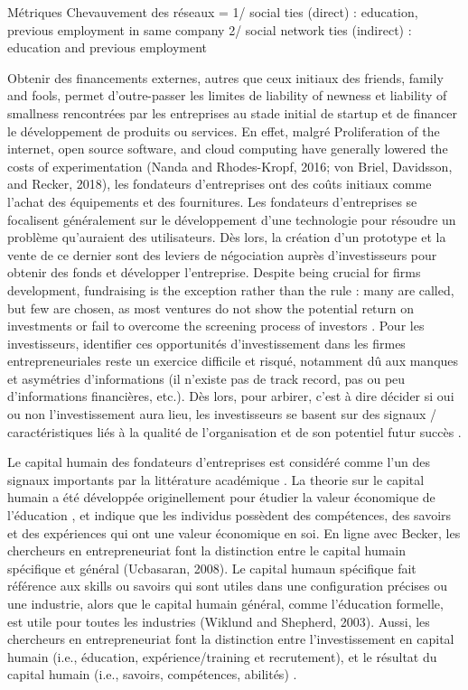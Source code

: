 \documentclass[11pt]{article}
\begin{document}
Métriques
Chevauvement des réseaux =
1/ social ties (direct) : education, previous employment in same company
2/ social network ties (indirect) : education and previous employment

Obtenir des financements externes, autres que ceux initiaux des friends, family and fools, permet d'outre-passer les limites de liability of newness et liability of smallness rencontrées par les entreprises au stade initial de startup et de financer le développement de produits ou services. En effet, malgré Proliferation of the internet, open source software, and cloud computing have generally lowered the costs of experimentation (Nanda and Rhodes-Kropf, 2016; von Briel, Davidsson, and Recker, 2018), les fondateurs d'entreprises ont des coûts initiaux comme l'achat des équipements et des fournitures. Les fondateurs d'entreprises se focalisent généralement sur le développement d'une technologie pour résoudre un problème qu'auraient des utilisateurs. Dès lors, la création d'un prototype et la vente de ce dernier sont des leviers de négociation auprès d'investisseurs pour obtenir des fonds et développer l'entreprise. Despite being crucial for firms development, fundraising is the exception rather than the rule : many are called, but few are chosen, as most ventures do not show the potential return on investments or fail to overcome the screening process of investors \citep{huang2017growing}. Pour les investisseurs, identifier ces opportunités d'investissement dans les firmes entrepreneuriales reste un exercice difficile et risqué, notamment dû aux manques et asymétries d'informations (il n'existe pas de track record, pas ou peu d'informations financières, etc.). Dès lors, pour arbirer, c'est à dire décider si oui ou non l'investissement aura lieu, les investisseurs se basent sur des signaux / caractéristiques liés à la qualité de l'organisation et de son potentiel futur succès \citep{plummer2016better}.

Le capital humain des fondateurs d'entreprises est considéré comme l'un des signaux importants par la littérature académique \citet{pinelli2020too, ko2018signaling}. La theorie sur le capital humain a été développée originellement pour étudier la valeur économique de l'éducation \citep{becker1964human}, et indique que les individus possèdent des compétences, des savoirs et des expériences qui ont une valeur économique en soi. En ligne avec Becker, les chercheurs en entrepreneuriat font la distinction entre le capital humain spécifique et général (Ucbasaran, 2008). Le capital humaun spécifique fait référence aux skills ou savoirs qui sont utiles dans une configuration précises ou une industrie, alors que le capital humain général, comme l'éducation formelle, est utile pour toutes les industries (Wiklund and Shepherd, 2003). Aussi, les chercheurs en entrepreneuriat font la distinction entre l'investissement en capital humain (i.e., éducation, expérience/training et recrutement), et le résultat du capital humain (i.e., savoirs, compétences, abilités) \citep{marvel2016human}.
\end{document}
